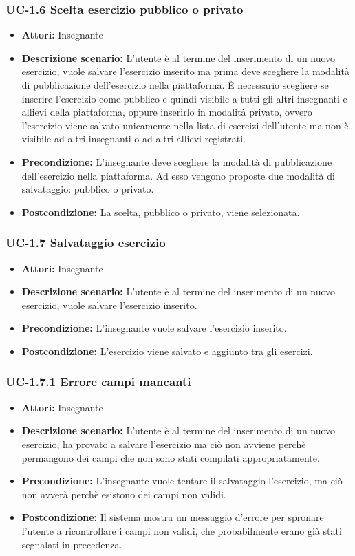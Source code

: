 \subsubsection{UC-1.6 Scelta esercizio pubblico o privato}
\begin{itemize}
\item \textbf{Attori: }Insegnante
\item \textbf{Descrizione scenario: }L'utente è al termine del inserimento di un nuovo esercizio, vuole salvare l'esercizio inserito ma prima deve scegliere la modalità di pubblicazione dell'esercizio nella piattaforma. È necessario scegliere se inserire l'esercizio come pubblico e quindi visibile a tutti gli altri insegnanti e allievi della piattaforma, oppure inserirlo in modalità privato, ovvero l'esercizio viene salvato unicamente nella lista di esercizi dell'utente ma non è visibile ad altri insegnanti o ad altri allievi registrati.
\item \textbf{Precondizione: }L'insegnante deve scegliere la modalità di pubblicazione dell'esercizio nella piattaforma. Ad esso vengono proposte due modalità di salvataggio: pubblico o privato.
\item \textbf{Postcondizione: }La scelta, pubblico o privato, viene selezionata.
\end{itemize}
\subsubsection{UC-1.7 Salvataggio esercizio}
\begin{itemize}
\item \textbf{Attori: }Insegnante
\item \textbf{Descrizione scenario: }L'utente è al termine del inserimento di un nuovo esercizio, vuole salvare l'esercizio inserito.
\item \textbf{Precondizione: }L'insegnante vuole salvare l'esercizio inserito.
\item \textbf{Postcondizione: }L'esercizio viene salvato e aggiunto tra gli esercizi.
\end{itemize}
\subsubsection{UC-1.7.1 Errore campi mancanti}
\begin{itemize}
\item \textbf{Attori: }Insegnante
\item \textbf{Descrizione scenario: }L'utente è al termine del inserimento di un nuovo esercizio, ha provato a salvare l'esercizio ma ciò non avviene perchè permangono dei campi che non sono stati compilati appropriatamente.
\item \textbf{Precondizione: }L'insegnante vuole tentare il salvataggio l'esercizio, ma ciò non avverà perchè esistono dei campi non validi.
\item \textbf{Postcondizione: }Il sistema mostra un messaggio d'errore per spronare l'utente a ricontrollare i campi non validi, che probabilmente erano già stati segnalati in precedenza.
\end{itemize}
\newpage

